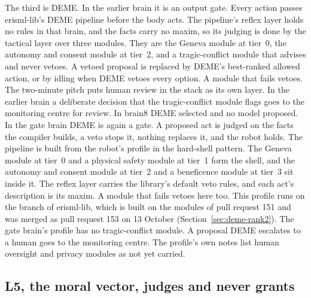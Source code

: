 The third is DEME. In the earlier brain it is an output gate. Every action passes erisml-lib's
DEME pipeline before the body acts. The pipeline's reflex layer holds no rules in that brain, and
the facts carry no maxim, so its judging is done by the tactical layer over three modules. They
are the Geneva module at tier~0, the autonomy and consent module at tier~2, and a tragic-conflict
module that advises and never vetoes. A vetoed proposal is replaced by DEME's best-ranked allowed
action, or by idling when DEME vetoes every option. A module that fails vetoes.
The two-minute pitch puts human review in the stack as its own layer. In the earlier brain a
deliberate decision that the tragic-conflict module flags goes to the monitoring centre for review.
In brain8 DEME selected and no model proposed. In the gate brain DEME is again a gate. A proposed
act is judged on the facts the compiler builds, a veto stops it, nothing replaces it, and the robot
holds. The pipeline is built from the robot's profile in the hard-shell pattern. The Geneva module at tier~0
and a physical safety module at tier~1 form the shell, and the autonomy and consent module at
tier~2 and a beneficence module at tier~3 sit inside it. The reflex layer carries the library's
default veto rules, and each act's description is its maxim. A module that fails vetoes here too. This profile runs on the branch
 of erisml-lib, which is built on the modules of pull request 151 and was
merged as pull request 153 on 13 October (Section~\ref{sec:deme-rank2}).
The gate brain's profile has no tragic-conflict module. A proposal DEME escalates to a human goes
to the monitoring centre. The profile's own notes list human oversight and privacy modules as not
yet carried.

\subsection*{L5, the moral vector, judges and never grants}

